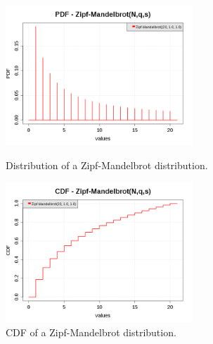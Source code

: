 \begin{figure}[H]
  \begin{minipage}{10cm}
    \begin{center}
      \includegraphics[width=7cm]{pdf_ZipfMandelbrot_1.png}
      \caption{Distribution of a  Zipf-Mandelbrot distribution.}
      \label{PDFZipfMandelbrot}
    \end{center}
  \end{minipage}
  \hfill
  \begin{minipage}{10cm}
    \begin{center}
      \includegraphics[width=7cm]{cdf_ZipfMandelbrot_1.png}
      \caption{CDF of a Zipf-Mandelbrot  distribution.}
      \label{CDFZipfMandelbrot}
    \end{center}
  \end{minipage}
\end{figure}

